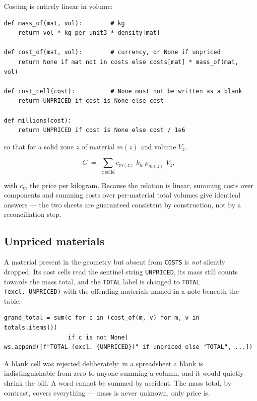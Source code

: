 \documentclass[9pt,a4paper]{extarticle}
\newcommand{\code}[1]{\texttt{\small #1}}
\begin{document}
Costing is entirely linear in volume:

\begin{lstlisting}[style=py]
def mass_of(mat, vol):        # kg
    return vol * kg_per_unit3 * density[mat]

def cost_of(mat, vol):        # currency, or None if unpriced
    return None if mat not in costs else costs[mat] * mass_of(mat, vol)

def cost_cell(cost):          # None must not be written as a blank
    return UNPRICED if cost is None else cost

def millions(cost):
    return UNPRICED if cost is None else cost / 1e6
\end{lstlisting}

so that for a solid zone $z$ of material $m(z)$ and volume $V_z$,

\begin{equation}
  C \;=\; \sum_{z\ \mathrm{solid}} c_{m(z)}\; k_u\; \rho_{m(z)}\; V_z ,
\end{equation}

with $c_m$ the price per kilogram. Because the relation is linear, summing costs
over components and summing costs over per-material total volumes give
identical answers --- the two sheets are guaranteed consistent by construction,
not by a reconciliation step.

\subsection{Unpriced materials}

A material present in the geometry but absent from \code{COSTS} is \emph{not}
silently dropped. Its cost cells read the sentinel string \code{UNPRICED}, its
mass still counts towards the mass total, and the \code{TOTAL} label is changed
to \code{TOTAL (excl.\ UNPRICED)} with the offending materials named in a note
beneath the table:

\begin{lstlisting}[style=py]
grand_total = sum(c for c in (cost_of(m, v) for m, v in totals.items())
                  if c is not None)
ws.append([f"TOTAL (excl. {UNPRICED})" if unpriced else "TOTAL", ...])
\end{lstlisting}

A blank cell was rejected deliberately: in a spreadsheet a blank is
indistinguishable from zero to anyone summing a column, and it would quietly
shrink the bill. A word cannot be summed by accident. The mass total, by
contrast, covers everything --- mass is never unknown, only price is.
\end{document}
